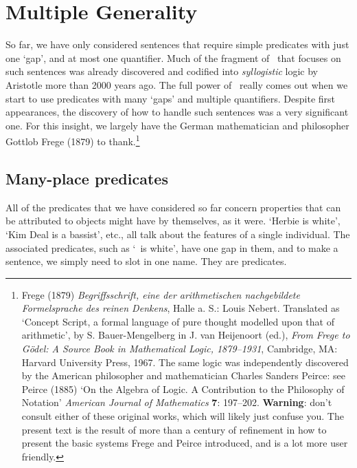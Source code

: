 \chapter{Multiple Generality}\label{s:MultipleGenerality}
So far, we have only considered sentences that require simple predicates with just one `gap', and at most one quantifier. Much of the fragment of \FOL\ that focuses on such sentences was already discovered and codified into \emph{syllogistic} logic by Aristotle more than 2000 years ago. The full power of \FOL\ really comes out when we start to use predicates with many `gaps' and multiple quantifiers. Despite first appearances, the discovery of how to handle such sentences was a very significant one.  For this insight, we largely have the German mathematician and philosopher Gottlob Frege (1879) to thank.\footnote{Frege (1879) \emph{Begriffsschrift, eine der arithmetischen nachgebildete Formelsprache des reinen Denkens}, Halle a. S.: Louis Nebert. Translated as `Concept Script, a formal language of pure thought modelled upon that of arithmetic', by S. Bauer-Mengelberg in J. van Heijenoort (ed.), \emph{From Frege to Gödel: A Source Book in Mathematical Logic, 1879–1931}, Cambridge, MA: Harvard University Press, 1967. The same logic was independently discovered by the American philosopher and mathematician Charles Sanders Peirce: see Peirce (1885) `On the Algebra of Logic. A Contribution to the Philosophy of Notation' \emph{American Journal of Mathematics} \textbf{7}: 197–202. \textbf{Warning}: don't consult either of these original works, which will likely just confuse you. The present text is the result of more than a century of refinement in how to present the basic systems Frege and Peirce introduced, and is a lot more user friendly.}



\section{Many-place predicates}
All of the predicates that we have considered so far concern properties that can be attributed to objects might have by themselves, as it were. `Herbie is white', `Kim Deal is a bassist', etc., all talk about the features of a single individual. The associated predicates, such as `\blank\ is white', have one gap in them, and to make a sentence, we simply need to slot in one name. They are  predicates. 

